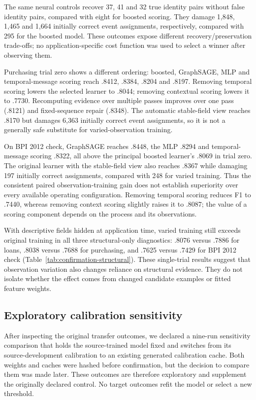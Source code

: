 \documentclass[11pt]{article}
\begin{document}
The same neural controls recover 37, 41 and 32 true identity pairs without false identity pairs, compared with eight for boosted scoring. They damage 1,848, 1,465 and 1,664 initially correct event assignments, respectively, compared with 295 for the boosted model. These outcomes expose different recovery/preservation trade-offs; no application-specific cost function was used to select a winner after observing them.

Purchasing trial zero shows a different ordering: boosted, GraphSAGE, MLP and temporal-message scoring reach .8412, .8384, .8204 and .8197. Removing temporal scoring lowers the selected learner to .8044; removing contextual scoring lowers it to .7730. Recomputing evidence over multiple passes improves over one pass (.8121) and fixed-sequence repair (.8348). The automatic stable-field view reaches .8170 but damages 6,363 initially correct event assignments, so it is not a generally safe substitute for varied-observation training.

On BPI 2012 check, GraphSAGE reaches .8448, the MLP .8294 and temporal-message scoring .8322, all above the principal boosted learner's .8069 in trial zero. The original learner with the stable-field view also reaches .8367 while damaging 197 initially correct assignments, compared with 248 for varied training. Thus the consistent paired observation-training gain does not establish superiority over every available operating configuration. Removing temporal scoring reduces F1 to .7440, whereas removing context scoring slightly raises it to .8087; the value of a scoring component depends on the process and its observations.

With descriptive fields hidden at application time, varied training still exceeds original training in all three structural-only diagnostics: .8076 versus .7886 for loans, .8038 versus .7688 for purchasing, and .7625 versus .7429 for BPI 2012 check (Table~\ref{tab:confirmation-structural}). These single-trial results suggest that observation variation also changes reliance on structural evidence. They do not isolate whether the effect comes from changed candidate examples or fitted feature weights.

\subsection{Exploratory calibration sensitivity}
After inspecting the original transfer outcomes, we declared a nine-run sensitivity comparison that holds the source-trained model fixed and switches from its source-development calibration to an existing generated calibration cache. Both weights and caches were hashed before confirmation, but the decision to compare them was made later. These outcomes are therefore exploratory and supplement the originally declared control. No target outcomes refit the model or select a new threshold.
\end{document}
